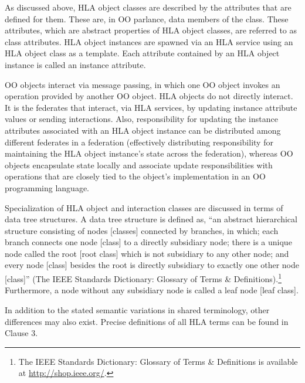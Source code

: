 As discussed above, HLA object classes are described by the attributes that are defined for them. These are, in OO parlance, data members of the class. These attributes, which are abstract properties of HLA object classes, are referred to as class attributes. HLA object instances are spawned via an HLA service using an HLA object class as a template. Each attribute contained by an HLA object instance is called an instance attribute.

OO objects interact via message passing, in which one OO object invokes an operation provided by another OO object. HLA objects do not directly interact. It is the federates that interact, via HLA services, by updating instance attribute values or sending interactions. Also, responsibility for updating the instance attributes associated with an HLA object instance can be distributed among different federates in a federation (effectively distributing responsibility for maintaining the HLA object instance's state across the federation), whereas OO objects encapsulate state locally and associate update responsibilities with operations that are closely tied to the object's implementation in an OO programming language.

Specialization of HLA object and interaction classes are discussed in terms of data tree structures. A data tree structure is defined as, ``an abstract hierarchical structure consisting of nodes [classes] connected by branches, in which; each branch connects one node [class] to a directly subsidiary node; there is a unique node called the root [root class] which is not subsidiary to any other node; and every node [class] besides the root is directly subsidiary to exactly one other node [class]'' (The IEEE Standards Dictionary: Glossary of Terms \& Definitions).\footnote{The IEEE Standards Dictionary: Glossary of Terms \& Definitions is available at \url{http://shop.ieee.org/}.} Furthermore, a node without any subsidiary node is called a leaf node [leaf class].

In addition to the stated semantic variations in shared terminology, other differences may also exist. Precise definitions of all HLA terms can be found in Clause 3.
